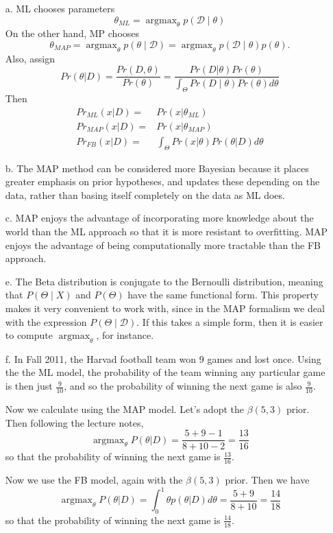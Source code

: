 \documentclass[12pt]{amsart}
\newcommand{\cal}[1]{\mathcal{#1}}
\DeclareMathOperator{\argmax}{argmax}
\theoremstyle{remark}
\begin{document}
\begin{enumerate}
\item[a.] ML chooses parameters
\[
\theta_{ML} = \argmax_{\theta} p(\cal{D} \mid \theta)
\] On the other hand, MP chooses 
\[
\theta_{MAP} = \argmax_{\theta} p(\theta \mid \cal{D}) = \argmax_{\theta} p(\cal{D} \mid \theta) p(\theta).
\]
Also, assign
\[
Pr(\theta|D) = \frac{Pr(D, \theta)}{Pr(\theta)} = \frac{Pr(D|\theta)Pr(\theta)}{\int_{\Theta} Pr(D \mid \theta)Pr(\theta)d\theta}
\]
Then
\begin{align*}
Pr_{ML}(x|D) =& Pr(x|\theta_{ML})\\
Pr_{MAP}(x|D) = & Pr(x|\theta_{MAP})\\
Pr_{FB}(x|D) = & \int_{\Theta} Pr(x|\theta)Pr(\theta|D) d\theta
\end{align*}


\item[b.]
The MAP method can be considered more Bayesian because it places greater emphasis on prior hypotheses, and updates these depending on the data, rather than basing itself completely on the data as ML does.

\item[c.]
MAP enjoys the advantage of incorporating more knowledge about the world than the ML approach so that it is more resistant to overfitting. MAP enjoys the advantage of being computationally more tractable than the FB approach.

\item[e.] The Beta distribution is conjugate to the Bernoulli distribution, meaning that $P(\Theta \mid X)$ and $P(\Theta)$ have the same functional form. This property makes it very convenient to work with, since in the MAP formalism we deal with the expression $P(\Theta \mid \cal{D})$. If this takes a simple form, then it is easier to compute $\argmax_{\theta}$, for instance. 

\item[f.]
In Fall 2011, the Harvad football team won 9 games and lost once. Using the the ML model, the probability of the team winning any particular game is then just $\frac{9}{10}$, and so the probability of winning the next game is also $\frac{9}{10}$.

Now we calculate using the MAP model. Let's adopt the $\beta(5,3)$ prior. Then following the lecture notes, 
\[
\argmax_{\theta}P(\theta|D) = \frac{5+9-1}{8+10-2}=\frac{13}{16}
\]
so that the probability of winning the next game is $\frac{13}{16}$.

Now we use the FB model, again with the $\beta(5,3)$ prior. Then we have
\[
\argmax_{\theta}P(\theta|D) = \int_{0}^1 \theta p(\theta|D) d\theta=\frac{5+9}{8+10}=\frac{14}{18}
\]
so that the probability of winning the next game is $\frac{14}{18}$.
\end{enumerate}
\end{document}
